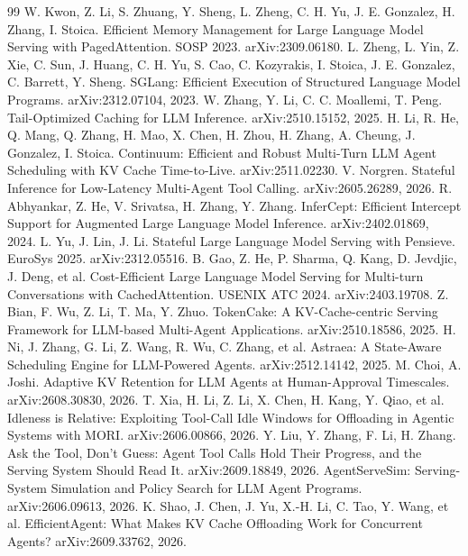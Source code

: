 \documentclass[11pt]{article}
\begin{document}
\begin{thebibliography}{99}
 W. Kwon, Z. Li, S. Zhuang, Y. Sheng, L. Zheng, C. H. Yu, J. E. Gonzalez, H. Zhang, I. Stoica. Efficient Memory Management for Large Language Model Serving with PagedAttention. SOSP 2023. arXiv:2309.06180.
 L. Zheng, L. Yin, Z. Xie, C. Sun, J. Huang, C. H. Yu, S. Cao, C. Kozyrakis, I. Stoica, J. E. Gonzalez, C. Barrett, Y. Sheng. SGLang: Efficient Execution of Structured Language Model Programs. arXiv:2312.07104, 2023.
 W. Zhang, Y. Li, C. C. Moallemi, T. Peng. Tail-Optimized Caching for LLM Inference. arXiv:2510.15152, 2025.
 H. Li, R. He, Q. Mang, Q. Zhang, H. Mao, X. Chen, H. Zhou, H. Zhang, A. Cheung, J. Gonzalez, I. Stoica. Continuum: Efficient and Robust Multi-Turn LLM Agent Scheduling with KV Cache Time-to-Live. arXiv:2511.02230.
 V. Norgren. Stateful Inference for Low-Latency Multi-Agent Tool Calling. arXiv:2605.26289, 2026.
 R. Abhyankar, Z. He, V. Srivatsa, H. Zhang, Y. Zhang. InferCept: Efficient Intercept Support for Augmented Large Language Model Inference. arXiv:2402.01869, 2024.
 L. Yu, J. Lin, J. Li. Stateful Large Language Model Serving with Pensieve. EuroSys 2025. arXiv:2312.05516.
 B. Gao, Z. He, P. Sharma, Q. Kang, D. Jevdjic, J. Deng, et al. Cost-Efficient Large Language Model Serving for Multi-turn Conversations with CachedAttention. USENIX ATC 2024. arXiv:2403.19708.
 Z. Bian, F. Wu, Z. Li, T. Ma, Y. Zhuo. TokenCake: A KV-Cache-centric Serving Framework for LLM-based Multi-Agent Applications. arXiv:2510.18586, 2025.
 H. Ni, J. Zhang, G. Li, Z. Wang, R. Wu, C. Zhang, et al. Astraea: A State-Aware Scheduling Engine for LLM-Powered Agents. arXiv:2512.14142, 2025.
 M. Choi, A. Joshi. Adaptive KV Retention for LLM Agents at Human-Approval Timescales. arXiv:2608.30830, 2026.
 T. Xia, H. Li, Z. Li, X. Chen, H. Kang, Y. Qiao, et al. Idleness is Relative: Exploiting Tool-Call Idle Windows for Offloading in Agentic Systems with MORI. arXiv:2606.00866, 2026.
 Y. Liu, Y. Zhang, F. Li, H. Zhang. Ask the Tool, Don't Guess: Agent Tool Calls Hold Their Progress, and the Serving System Should Read It. arXiv:2609.18849, 2026.
 AgentServeSim: Serving-System Simulation and Policy Search for LLM Agent Programs. arXiv:2606.09613, 2026.
 K. Shao, J. Chen, J. Yu, X.-H. Li, C. Tao, Y. Wang, et al. EfficientAgent: What Makes KV Cache Offloading Work for Concurrent Agents? arXiv:2609.33762, 2026.

\end{thebibliography}
\end{document}
